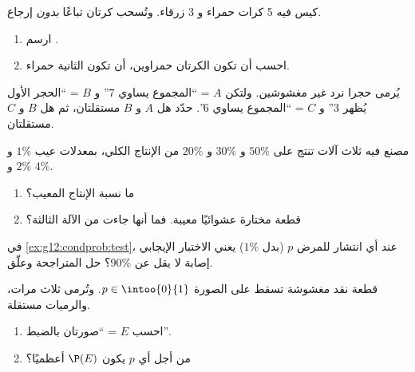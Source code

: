 \begin{exercise}[$\star$]\label{exo:g12:condprob:2}
كيس فيه 5 كرات حمراء و 3 زرقاء. وتُسحب كرتان تباعًا
\emph{بدون} إرجاع.
\begin{enumerate}
  \item ارسم .
  \item احسب  أن تكون الكرتان حمراوين،  أن تكون
        الثانية حمراء.
\end{enumerate}
\end{exercise}

\begin{exercise}[$\star$]\label{exo:g12:condprob:3}
يُرمى حجرا نرد غير مغشوشين. ولتكن $A$ = ``المجموع يساوي $7$'' و $B$ = ``الحجر
الأول يُظهر $3$'' و $C$ = ``المجموع يساوي $6$''. حدّد هل $A$ و $B$
مستقلتان، ثم هل $B$ و $C$ مستقلتان.
\end{exercise}

\begin{exercise}[$\star\star$]\label{exo:g12:condprob:4}
مصنع فيه ثلاث آلات تنتج على  $50\%$ و $30\%$ و
$20\%$ من الإنتاج الكلي، بمعدلات عيب $1\%$ و $2\%$ و $4\%$.
\begin{enumerate}
  \item ما نسبة الإنتاج المعيب؟
  \item قطعة مختارة عشوائيًا معيبة. فما  أنها
        جاءت من الآلة الثالثة؟
\end{enumerate}
\end{exercise}

\begin{exercise}[$\star\star$]\label{exo:g12:condprob:5}
في \cref{ex:g12:condprob:test}، عند أي انتشار للمرض $p$ (بدل
$1\%$) يعني الاختبار الإيجابي  إصابة لا يقل عن $90\%$؟ حل
المتراجحة وعلّق.
\end{exercise}

\begin{exercise}[$\star\star$]\label{exo:g12:condprob:6}
قطعة نقد مغشوشة تسقط على الصورة  $p \in \intoo{0}{1}$. وتُرمى
ثلاث مرات، والرميات مستقلة.
\begin{enumerate}
  \item احسب   $E$ = ``صورتان بالضبط''.
  \item من أجل أي $p$ يكون $\P(E)$ أعظميًا؟
\end{enumerate}
\end{exercise}

